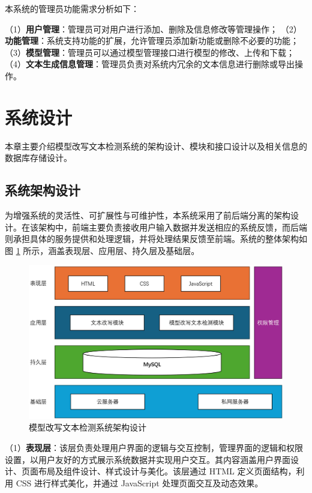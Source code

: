 本系统的管理员功能需求分析如下：

（1）\textbf{用户管理}：管理员可对用户进行添加、删除及信息修改等管理操作；
（2）\textbf{功能管理}：系统支持功能的扩展，允许管理员添加新功能或删除不必要的功能；
（3）\textbf{模型管理}：管理员可以通过模型管理接口进行模型的修改、上传和下载；
（4）\textbf{文本生成信息管理}：管理员负责对系统内冗余的文本信息进行删除或导出操作。

\section{系统设计}
\label{sec:sys-design}

本章主要介绍模型改写文本检测系统的架构设计、模块和接口设计以及相关信息的数据库存储设计。

\subsection{系统架构设计}
\label{sec:sys-arch}

为增强系统的灵活性、可扩展性与可维护性，本系统采用了前后端分离的架构设计。在该架构中，前端主要负责接收用户输入数据并发送相应的系统反馈，而后端则承担具体的服务提供和处理逻辑，并将处理结果反馈至前端。系统的整体架构如图 \ref{fig:sys-arch} 所示，涵盖表现层、应用层、持久层及基础层。

\begin{figure}[htb]
    \centering
    \includegraphics[width=\textwidth]{figures/sys-architecture.jpg}
    \caption{模型改写文本检测系统架构设计}
    \label{fig:sys-arch}
\end{figure}

（1）\textbf{表现层}：该层负责处理用户界面的逻辑与交互控制，管理界面的逻辑和权限设置，以用户友好的方式展示系统数据并实现用户交互。其内容涵盖用户界面设计、页面布局及组件设计、样式设计与美化。该层通过 HTML 定义页面结构，利用 CSS 进行样式美化，并通过 JavaScript 处理页面交互及动态效果。

